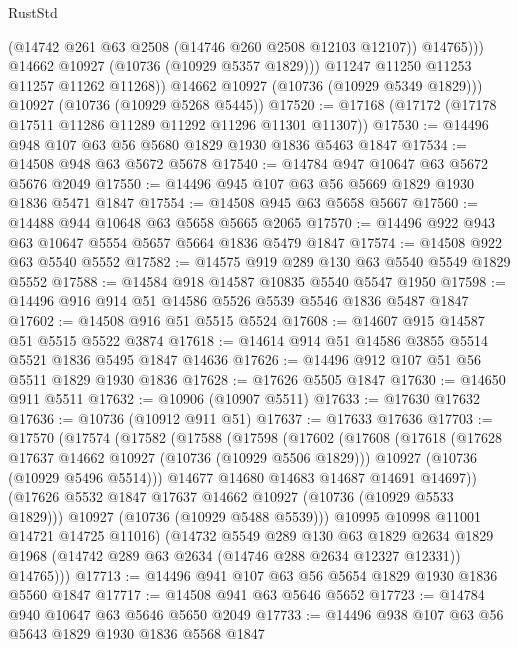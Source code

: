 \begin{lexlean}{RustStd}
\begin{coremodule}
                  (@14742 @261 @63 @2508 (@14746 @260 @2508 @12103 @12107))
                  @14765)))
            @14662
            @10927
            (@10736 (@10929 @5357 @1829)))
          @11247
          @11250
          @11253
          @11257
          @11262
          @11268))
      @14662
      @10927
      (@10736 (@10929 @5349 @1829)))
    @10927
    (@10736 (@10929 @5268 @5445))
@17520 := @17168 (@17172 (@17178 @17511 @11286 @11289 @11292 @11296 @11301 @11307))
@17530 := @14496 @948 @107 @63 @56 @5680 @1829 @1930 @1836 @5463 @1847
@17534 := @14508 @948 @63 @5672 @5678
@17540 := @14784 @947 @10647 @63 @5672 @5676 @2049
@17550 := @14496 @945 @107 @63 @56 @5669 @1829 @1930 @1836 @5471 @1847
@17554 := @14508 @945 @63 @5658 @5667
@17560 := @14488 @944 @10648 @63 @5658 @5665 @2065
@17570 := @14496 @922 @943 @63 @10647 @5554 @5657 @5664 @1836 @5479 @1847
@17574 := @14508 @922 @63 @5540 @5552
@17582 := @14575 @919 @289 @130 @63 @5540 @5549 @1829 @5552
@17588 := @14584 @918 @14587 @10835 @5540 @5547 @1950
@17598 := @14496 @916 @914 @51 @14586 @5526 @5539 @5546 @1836 @5487 @1847
@17602 := @14508 @916 @51 @5515 @5524
@17608 := @14607 @915 @14587 @51 @5515 @5522 @3874
@17618 := @14614 @914 @51 @14586 @3855 @5514 @5521 @1836 @5495 @1847 @14636
@17626 := @14496 @912 @107 @51 @56 @5511 @1829 @1930 @1836
@17628 := @17626 @5505 @1847
@17630 := @14650 @911 @5511
@17632 := @10906 (@10907 @5511)
@17633 := @17630 @17632
@17636 := @10736 (@10912 @911 @51)
@17637 := @17633 @17636
@17703 := @17570
    (@17574
      (@17582
        (@17588
          (@17598
            (@17602
              (@17608
                (@17618
                  (@17628 @17637 @14662 @10927 (@10736 (@10929 @5506 @1829)))
                  @10927
                  (@10736 (@10929 @5496 @5514)))
                @14677
                @14680
                @14683
                @14687
                @14691
                @14697))
            (@17626 @5532 @1847 @17637 @14662 @10927 (@10736 (@10929 @5533 @1829)))
            @10927
            (@10736 (@10929 @5488 @5539)))
          @10995
          @10998
          @11001
          @14721
          @14725
          @11016)
        (@14732
          @5549
          @289
          @130
          @63
          @1829
          @2634
          @1829
          @1968
          (@14742 @289 @63 @2634 (@14746 @288 @2634 @12327 @12331))
          @14765)))
@17713 := @14496 @941 @107 @63 @56 @5654 @1829 @1930 @1836 @5560 @1847
@17717 := @14508 @941 @63 @5646 @5652
@17723 := @14784 @940 @10647 @63 @5646 @5650 @2049
@17733 := @14496 @938 @107 @63 @56 @5643 @1829 @1930 @1836 @5568 @1847

\end{coremodule}
\end{lexlean}
